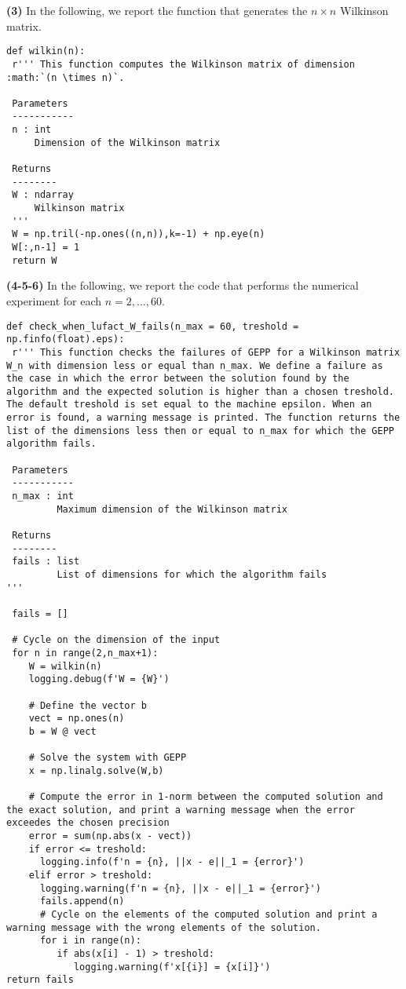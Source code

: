 \documentclass[a4paper,11pt]{article}
\begin{document}
\noindent \textbf{(3)} In the following, we report the function that generates the $n \times n $ Wilkinson matrix.
\begin{verbatim}
def wilkin(n):
 r''' This function computes the Wilkinson matrix of dimension :math:`(n \times n)`.
 
 Parameters
 -----------
 n : int
     Dimension of the Wilkinson matrix
 
 Returns
 --------
 W : ndarray
     Wilkinson matrix
 '''
 W = np.tril(-np.ones((n,n)),k=-1) + np.eye(n)
 W[:,n-1] = 1
 return W
\end{verbatim}
\noindent \textbf{(4-5-6)} In the following, we report the code that performs the numerical experiment for each $n=2,\dots,60$.

\begin{verbatim}
def check_when_lufact_W_fails(n_max = 60, treshold = np.finfo(float).eps):
 r''' This function checks the failures of GEPP for a Wilkinson matrix W_n with dimension less or equal than n_max. We define a failure as the case in which the error between the solution found by the algorithm and the expected solution is higher than a chosen treshold. The default treshold is set equal to the machine epsilon. When an error is found, a warning message is printed. The function returns the list of the dimensions less then or equal to n_max for which the GEPP algorithm fails.

 Parameters
 -----------
 n_max : int
         Maximum dimension of the Wilkinson matrix

 Returns
 --------
 fails : list
         List of dimensions for which the algorithm fails
'''

 fails = []

 # Cycle on the dimension of the input
 for n in range(2,n_max+1):
    W = wilkin(n)
    logging.debug(f'W = {W}')

    # Define the vector b
    vect = np.ones(n)
    b = W @ vect

    # Solve the system with GEPP
    x = np.linalg.solve(W,b)

    # Compute the error in 1-norm between the computed solution and the exact solution, and print a warning message when the error exceedes the chosen precision
    error = sum(np.abs(x - vect))
    if error <= treshold:
      logging.info(f'n = {n}, ||x - e||_1 = {error}')
    elif error > treshold:
      logging.warning(f'n = {n}, ||x - e||_1 = {error}')
      fails.append(n)
      # Cycle on the elements of the computed solution and print a warning message with the wrong elements of the solution.
      for i in range(n):
         if abs(x[i] - 1) > treshold:
            logging.warning(f'x[{i}] = {x[i]}')
return fails

\end{verbatim}
\end{document}
